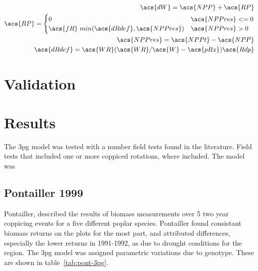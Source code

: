 \documentclass[10pt]{article}
\begin{document}
\begin{align}
\acs{dW}=\acs{NPP}+\acs{RP} \\
\acs{RP} = \begin{cases} 0 & \acs{NPPres} <=0 \\
\acs{fR} ~ min (\acs{dRdef} ,\acs{NPPres}) & \acs{NPPres} > 0  
\end{cases} \\
\acs{NPPres} = \acs{NPPt}-\acs{NPP} \\
\acs{dRdef} = \acs{WR}(\acs{WR}/\acs{W} - \acs{pRx})\acs{Rdp}
\end{align}



\section*{Validation}

\section*{Results}

The \ac{3pg} model was tested with a number field tests found in the
literature.  Field tests that included one or more coppiced rotations,
where included.  The model was

\subsection{Pontailler 1999}
\label{sec:pont}

Pontailler, \cite{pontailler99biomass-yield} described the results of
biomass measurements over 5 two year coppicing events for a five
different poplar species.  Pontailler found consistant biomass returns
on the plots for the most part, and attributed differences, especially
the lower returns in 1991-1992, as due to drought conditions for the
region.  The \ac{3pg} model was assigned parametric variations due to
genotype.  These are shown in table~\ref{tab:pont-3pg}.

\begin{table}[!ht]
  \centering
  \caption{\ac{3pg} parameter variations of \ac{3pg} among genotypes}
  \label{tab:pont-3pg}
\end{table}
\end{document}
